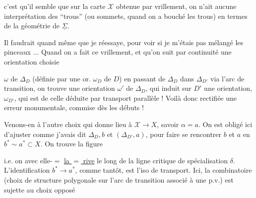 c'est qu'il semble que sur la carte $\mathscr X$ obtenue par vrillement, on n'ait aucune interprétation des ``trous'' (ou sommets, quand on a bouché les trous) en termes de la géométrie de $\underline{\Sigma}$.

 Il faudrait quand même que je réessaye, pour voir si je  m'étais pas mélangé les pinceaux $\ldots$  Quand on a fait ce vrillement, et qu'on suit par continuité une orientation choisie

$\omega$ de $\Delta_D$ (définie par une or. $\omega_D$ de $D$) en passant de $\Delta_D$ dans $\Delta_{D'}$ via l'arc de transition, on trouve  une orientation $\omega'$ de $\Delta_D$, qui induit sur $D'$ une orientation, $\omega_{D'}$, qui est  de celle déduite par transport  parallèle ! Voilà donc rectifiée une erreur monumentale, commise dès les débuts !

Venons-en à l'autre choix qui donne lieu à $\mathscr X\to X$, savoir $\alpha=a$. On est obligé ici d'ajuster comme j'avais dit $\Delta_D,b$ et $(\Delta_{D'},a)$, pour faire se rencontrer $b$ et $a$ en $b^*\sim a^*\subset X$. On trouve la figure


i.e. on  avec elle-\ensuremath{=} \uline{la $=$ rive}  le long de la ligne critique de spécialisation $\delta$. L'identification $b^*\to a^*$, comme tantôt, est l'iso de transport. Ici, la combinatoire (choix  de structure polygonale sur l'arc de transition associé à une p.v.) est sujette au choix opposé
